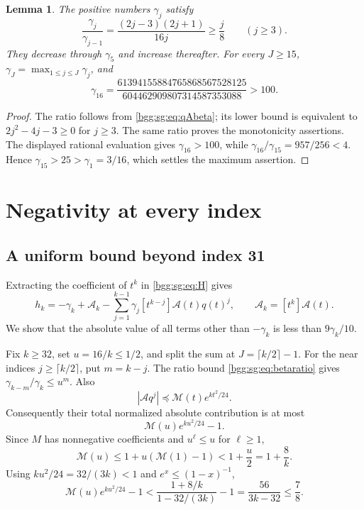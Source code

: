 \documentclass[11pt,a4paper]{article}
\numberwithin{equation}{section}
\newtheorem{lemma}[theorem]{Lemma}
\theoremstyle{definition}
\theoremstyle{remark}
\theoremstyle{definition}
\begin{document}
\begin{lemma}\label{bgg:sg:lem:beta}
The positive numbers \(\gamma_j\) satisfy
\begin{equation}\label{bgg:sg:eq:betaratio}
 \frac{\gamma_j}{\gamma_{j-1}}
  =\frac{(2j-3)(2j+1)}{16j}\ge\frac j8
  \qquad(j\ge3).
\end{equation}
They decrease through \(\gamma_5\) and increase thereafter.
For every \(J\ge15\), \(\gamma_J=\max_{1\le j\le J}\gamma_j\), and
\[
 \gamma_{16}=
 \frac{61394155884765868567528125}
      {604462909807314587353088}>100.
\]
\end{lemma}

\begin{proof}
The ratio follows from \eqref{bgg:sg:eq:qAbeta}; its lower bound is equivalent
to \(2j^2-4j-3\ge0\) for \(j\ge3\).  The same ratio proves the
monotonicity assertions.  The displayed rational evaluation gives
\(\gamma_{16}>100\), while
\(\gamma_{16}/\gamma_{15}=957/256<4\).  Hence
\(\gamma_{15}>25>\gamma_1=3/16\), which settles the maximum assertion.
\end{proof}

\section{Negativity at every index}\label{bgg:sg:sec:signproof}

\subsection{A uniform bound beyond index 31}

Extracting the coefficient of \(t^k\) in \eqref{bgg:sg:eq:H} gives
\begin{equation}\label{bgg:sg:eq:hkdecomp}
 h_k=-\gamma_k+\mathcal A_k
       -\sum_{j=1}^{k-1}\gamma_j[t^{k-j}]\mathcal A(t)q(t)^j,
 \qquad \mathcal A_k=[t^k]\mathcal A(t).
\end{equation}
We show that the absolute value of all terms other than
\(-\gamma_k\) is less than \(9\gamma_k/10\).

Fix \(k\ge32\), set \(u=16/k\le1/2\), and split the sum at
\(J=\lceil k/2\rceil-1\).
For the near indices \(j\ge\lceil k/2\rceil\), put \(m=k-j\).
The ratio bound \eqref{bgg:sg:eq:betaratio} gives
\(\gamma_{k-m}/\gamma_k\le u^m\).
Also
\[
 |\mathcal A q^j|\preccurlyeq \mathcal M(t)e^{kt^2/24}.
\]
Consequently their total normalized absolute contribution is at most
\begin{equation}\label{bgg:sg:eq:nearerror}
 \mathcal M(u)e^{ku^2/24}-1.
\end{equation}
Since \(M\) has nonnegative coefficients and \(u^\ell\le u\) for
\(\ell\ge1\),
\[
 \mathcal M(u)\le1+u(\mathcal M(1)-1)<1+\frac u2=1+\frac8k.
\]
Using \(ku^2/24=32/(3k)<1\) and \(e^x\le(1-x)^{-1}\),
\begin{equation}\label{bgg:sg:eq:nearbound}
 \mathcal M(u)e^{ku^2/24}-1
 <\frac{1+8/k}{1-32/(3k)}-1
 =\frac{56}{3k-32}\le\frac78.
\end{equation}
\end{document}
